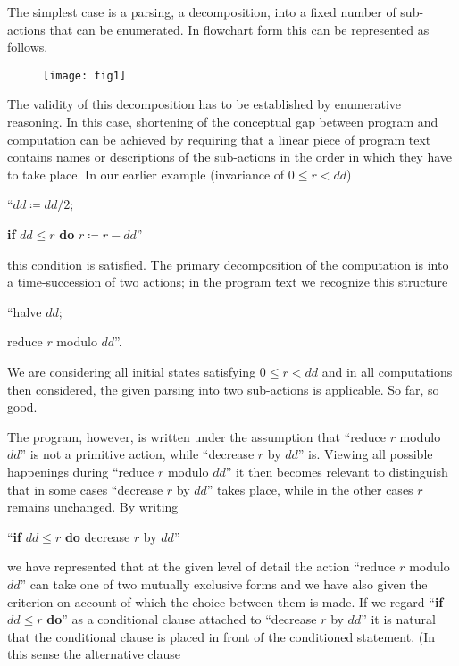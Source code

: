 The simplest case is a parsing, a decomposition, into a fixed number of sub-actions that can be enumerated. In flowchart form this can be represented as follows. 

\begin{figure}[h]
	\centering
	\texttt{[image: fig1]}
\end{figure}

The validity of this decomposition has to be established by enumerative reasoning. In this case, shortening of the conceptual gap between program and computation can be achieved by requiring that a linear piece of program text contains names or descriptions of the sub-actions in the order in which they have to take place. In our earlier example (invariance of $0 \leqslant r < dd$)
\medskip

{
	\setlength{\parindent}{8em}
	\hspace{-.5em}``$dd \coloneq dd/2;$
	
	\textbf{if} $dd \leqslant r$ \textbf{do} $r \coloneq r - dd$''
}
\medskip

\noindent
this condition is satisfied. The primary decomposition of the computation is into a time-succession of two actions; in the program text we recognize this structure
\medskip

{
	\setlength{\parindent}{8em}
	\hspace{-.5em}``halve $dd;$
	
	reduce $r$ modulo $dd$''.
}
\medskip

We are considering all initial states satisfying $0 \leqslant r < dd$ and in all computations then considered, the given parsing into two sub-actions is applicable. So far, so good.

The program, however, is written under the assumption that ``reduce $r$ modulo $dd$'' is not a primitive action, while ``decrease $r$ by $dd$'' is. Viewing all possible happenings during ``reduce $r$ modulo $dd$'' it then becomes relevant to distinguish that in some cases ``decrease $r$ by $dd$'' takes place, while in the other cases $r$ remains unchanged. By writing
\medskip

{
	\setlength{\parindent}{8em}
	\hspace{-.5em}``\textbf{if} $dd \leqslant r$ \textbf{do} decrease $r$ by $dd$''
}
\medskip

\noindent
we have represented that at the given level of detail the action ``reduce $r$ modulo $dd$'' can take one of two mutually exclusive forms and we have also given the criterion on account of which the choice between them is made. If we regard ``\textbf{if} $dd \leqslant r$ \textbf{do}'' as a conditional clause attached to ``decrease $r$ by $dd$'' it is natural that the conditional clause is placed in front of the conditioned statement. (In this sense the alternative clause
\medskip

